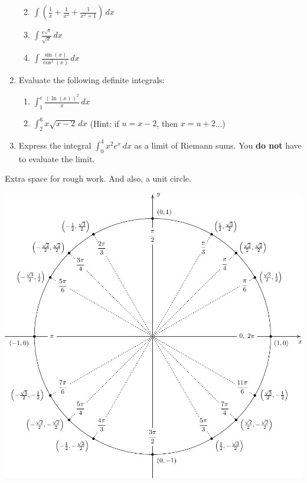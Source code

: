 \documentclass[12pt]{article}
\newcommand{\points}[1]{\marginpar{\hspace{24pt}[#1]}}
\newcommand{\di}{\displaystyle}
\begin{document}
\begin{enumerate}
\begin{enumerate}
\vspace{1.5in}

 \item $\di \int\left(\frac{1}{x}+\frac{1}{x^2}+\frac{1}{x^2+1}\right)\,dx$ \points{2}

\vspace{1.5in}

 \item $\di \int \frac{e^{\sqrt{x}}}{\sqrt{x}}\,dx$ \points{3}

\vspace{2in}

 \item $\di \int \frac{\sin(x)}{\cos^2(x)}\,dx$ \points{3}
\end{enumerate}
\newpage

\item Evaluate the following definite integrals:
\begin{enumerate}
 \item $\di \int_1^e \frac{(\ln(x))^2}{x}\,dx$ \points{3}

\vspace{2.5in}

 \item $\di \int_2^6 x\sqrt{x-2}\,dx$ \points{3} (Hint: if $u=x-2$, then $x=u+2$...)
\end{enumerate}

\vspace{2.5in}

\item Express the integral $\di \int_0^4 x^2e^x\,dx$ as a limit of Riemann sums. You \textbf{do not} have to evaluate the limit.\points{4}

\end{enumerate}
\newpage

Extra space for rough work. And also, a unit circle.

\vspace*{\fill}

\begin{center}
 \includegraphics{UnitCircle}
\end{center}
\end{document}
